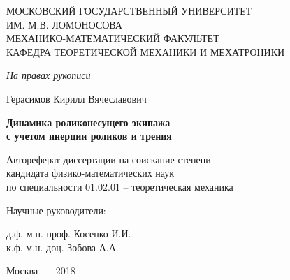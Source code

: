 \thispagestyle{empty}%
\begin{center}%
\MakeUppercase{Московский государственный университет}\\
\MakeUppercase{им. М.В. Ломоносова}\\
\MakeUppercase{механико-математический факультет}\\
\MakeUppercase{кафедра теоретической механики и мехатроники}
\end{center}%
%
\vspace{0pt plus4fill} %
\begin{flushright}%

\textit {На правах рукописи}

\end{flushright}%
%
\vspace{0pt plus6fill} %
\begin{center}%
{\large Герасимов Кирилл Вячеславович}
\end{center}%
%
\vspace{0pt plus1fill} %
\begin{center}%
\textbf {\large Динамика роликонесущего экипажа \\ с учетом инерции роликов и трения}


\vspace{0pt plus2fill} %
Автореферат диссертации на соискание степени \\ кандидата физико-математических наук\\
по специальности 01.02.01 -- теоретическая механика

\end{center}%
%
\vspace{0pt plus4fill} %
\begin{flushright}%
Научные руководители:

д.ф.-м.н. проф. Косенко И.И.\\
к.ф.-м.н. доц. Зобова А.А.

\end{flushright}%
%
\vspace{0pt plus4fill} %
\begin{center}%
{Москва~--- 2018}
\end{center}%
\newpage

